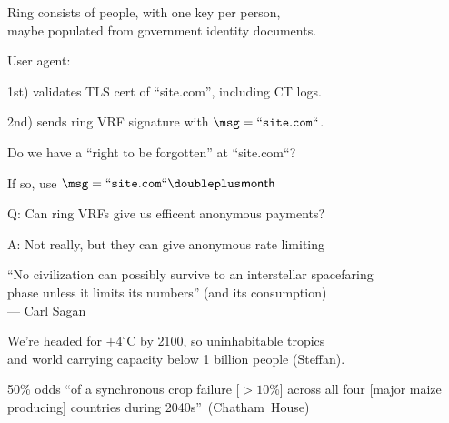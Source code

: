 \documentclass{beamer}
\begin{document}
\begin{frame} %

Ring consists of people, with one key per person, \\ 
\hspace{10pt} maybe populated from government identity documents.

\bigskip\smallskip

User agent: \\ \smallskip

1st) validates TLS cert of ``site.com'', including CT logs. \\ \smallskip

2nd) sends ring VRF signature with $\msg = \mathtt{``site.com``}$. \\ \smallskip

\pause\bigskip\bigskip 

Do we have a ``right to be forgotten'' at ``site.com``? \\ \smallskip

\hspace{10pt} If so, use $\msg = \mathtt{``site.com``} \doubleplus \mathsf{month}$

\end{frame}



\begin{frame}

Q: Can ring VRFs give us efficent anonymous payments?

\bigskip

A: Not really, but they can give anonymous rate limiting

\end{frame}



\begin{frame}

``No civilization can possibly survive to an interstellar spacefaring \\ \smallskip
\hspace{1pt} phase unless it limits its numbers'' (and its consumption) \\ \medskip
\hspace{1pt} --- Carl Sagan

\bigskip\bigskip 

We're headed for $+4^{\circ}$C by 2100, so uninhabitable tropics \\
\hspace{10pt} and world carrying capacity below 1 billion people (Steffan). \\ \bigskip

50\% odds ``of a synchronous crop failure [$>10$\%] across all four [major maize producing] countries during 2040s''~(Chatham~House) \\

\end{frame}
\end{document}

